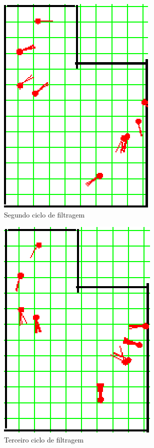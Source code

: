 \begin{figure}[H]
  \centering
  \includegraphics[scale=1]{figuras/cen4_ex2/3.eps}
  \caption[Segundo Ciclo de Filtragem]{Segundo ciclo de filtragem}
  \label{img:cen4_ex2_3}
\end{figure}

\begin{figure}[H]
  \centering
  \includegraphics[scale=1]{figuras/cen4_ex2/4.eps}
  \caption[Terceiro Ciclo de Filtragem]{Terceiro ciclo de filtragem}
  \label{img:cen4_ex2_4}
\end{figure}

